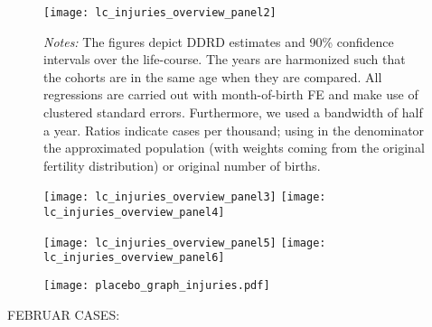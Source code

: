 \begin{landscape}
\begin{figure}[H]
\centering
\begin{minipage}{.9\linewidth}
\texttt{[image: lc\_injuries\_overview\_panel2]}
{\scriptsize \emph{Notes:} The figures depict DDRD estimates and 90\% confidence intervals over the life-course. The years are harmonized such that the cohorts are in the same age when they are compared. All regressions are carried out with month-of-birth FE and make use of clustered standard errors. Furthermore, we used a bandwidth of half a year. Ratios indicate cases per thousand; using in the denominator the approximated population (with weights coming from the original fertility distribution) or original number of births. \par}
\end{minipage}
\end{figure}
\end{landscape}
\begin{figure}[H]%
	\centering
	\texttt{[image: lc\_injuries\_overview\_panel3]}
	\texttt{[image: lc\_injuries\_overview\_panel4]}
\end{figure}
\begin{figure}[H]
	\centering	
	\texttt{[image: lc\_injuries\_overview\_panel5]}
	\texttt{[image: lc\_injuries\_overview\_panel6]}
\end{figure}
%
\begin{figure}[H]%
	\centering
	\texttt{[image: placebo\_graph\_injuries.pdf]}
\end{figure}




%
FEBRUAR CASES:


